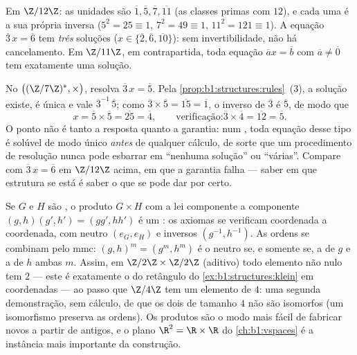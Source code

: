 \begin{example}[Calculando em $\Z/n\Z$]\label{ex:b1:structures:zncomputation}
Em $\Z/12\Z$: as unidades são $\overline 1, \overline 5, \overline 7,
\overline{11}$ (as classes primas com $12$), e cada uma é a sua própria
inversa ($5^2 = 25 \equiv 1$, $7^2 = 49 \equiv 1$, $11^2 = 121 \equiv
1$). A equação $\overline 3\, x = \overline 6$ tem \emph{três}
soluções ($x \in \{\overline 2, \overline 6, \overline{10}\}$):
sem invertibilidade, não há cancelamento. Em $\Z/11\Z$, em contrapartida,
toda equação $\overline a x = \overline b$ com $\overline a \neq
\overline 0$ tem exatamente uma solução.
\end{example}

\begin{example}\label{ex:b1:structures:solving}
No  $\bigl((\Z/7\Z)^*, \times\bigr)$, resolva $\overline
3\,x = \overline 5$. Pela \cref{prop:b1:structures:rules}~(3), a
solução existe, é única e vale $\overline3^{-1}\,
\overline5$; como $\overline3 \times \overline5 = \overline{15}
= \overline1$, o inverso de $\overline 3$ é $\overline 5$, de modo que
\[
x = \overline5 \times \overline5 = \overline{25} = \overline4,
\qquad\text{verificação:} \overline3 \times \overline4 =
\overline{12} = \overline5 .
\]
O ponto não é tanto a resposta quanto a garantia: num ,
toda equação desse tipo é solúvel de modo único \emph{antes} de
qualquer cálculo, de sorte que um procedimento de resolução nunca pode
esbarrar em ``nenhuma solução'' ou ``várias''. Compare com $\overline3\,x = \overline6$
em $\Z/12\Z$ acima, em que a garantia falha --- saber em que
estrutura se está é saber o que se pode dar por certo.
\end{example}

\begin{example}\label{ex:b1:structures:product}
Se $G$ e $H$ são , o  produto $G \times H$ com a lei
componente a componente $(g, h)(g', h') = (gg', hh')$ é um :
os axiomas se verificam coordenada a coordenada, com neutro
$(e_G, e_H)$ e inversos $(g^{-1}, h^{-1})$. As ordens se combinam pelo
mmc: $(g, h)^m = (g^m, h^m)$ é o neutro se, e somente se, a 
de $g$ e a  de $h$  ambas $m$. Assim, em $\Z/2\Z
\times \Z/2\Z$ (aditivo) todo elemento não nulo tem  $2$
--- este é exatamente o  do retângulo do
\cref{ex:b1:structures:klein} em coordenadas --- ao passo que $\Z/4\Z$
tem um elemento de  $4$: uma segunda demonstração, sem cálculo,
de que os dois  de tamanho $4$ não são isomorfos (um
isomorfismo preserva as ordens). Os produtos são o modo mais fácil de
fabricar  novos a partir de antigos, e o plano $\R^2 = \R \times
\R$ do \cref{ch:b1:vspaces} é a instância mais importante da construção.
\end{example}

